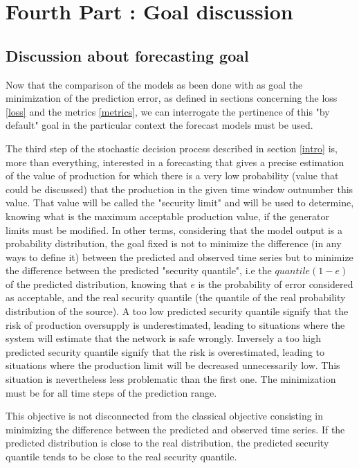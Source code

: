 \section{Fourth Part : Goal discussion} \label{part4}

\subsection{Discussion about forecasting goal} \label{goal}

Now that the comparison of the models as been done with as goal the minimization of the prediction error, as defined in sections concerning the loss \ref{loss} and the metrics \ref{metrics}, we can interrogate the pertinence of this "by default" goal in the particular context the forecast models must be used.

The third step of the stochastic decision process described in section \ref{intro} is, more than everything, interested in a forecasting that gives a precise estimation of the value of production for which there is a very low probability (value that could be discussed) that the production in the given time window outnumber this value. That value will be called the "security limit" and will be used to determine, knowing what is the maximum acceptable production value, if the generator limits must be modified.
In other terms, considering that the model output is a probability distribution, the goal fixed is not to minimize the difference (in any ways to define it) between the predicted and observed time series but to minimize the difference between the predicted "security quantile", i.e the $quantile(1-e)$ of the predicted distribution, knowing that $e$ is the probability of error considered as acceptable, and the real security quantile (the quantile of the real probability distribution of the source).
A too low predicted security quantile signify that the risk of production oversupply is underestimated,
leading to situations where the system will estimate that the network is safe wrongly. 
Inversely a too high predicted security quantile signify that the risk is overestimated, leading to situations where the production limit will be decreased unnecessarily low. This situation is nevertheless less problematic than the first one.
The minimization must be for all time steps of the prediction range. 

This objective is not disconnected from the classical objective consisting in minimizing the difference between the predicted and observed time series.
If the predicted distribution is close to the real distribution, the predicted security quantile tends to be close to the real security quantile.



